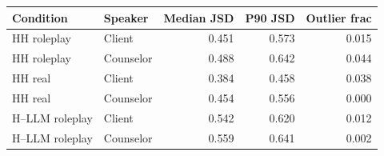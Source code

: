 \begin{tabular}{llrrr}
\toprule
Condition & Speaker & Median JSD & P90 JSD & Outlier frac \\
\midrule
HH roleplay & Client & 0.451 & 0.573 & 0.015 \\
HH roleplay & Counselor & 0.488 & 0.642 & 0.044 \\
HH real & Client & 0.384 & 0.458 & 0.038 \\
HH real & Counselor & 0.454 & 0.556 & 0.000 \\
H--LLM roleplay & Client & 0.542 & 0.620 & 0.012 \\
H--LLM roleplay & Counselor & 0.559 & 0.641 & 0.002 \\
\bottomrule
\end{tabular}
